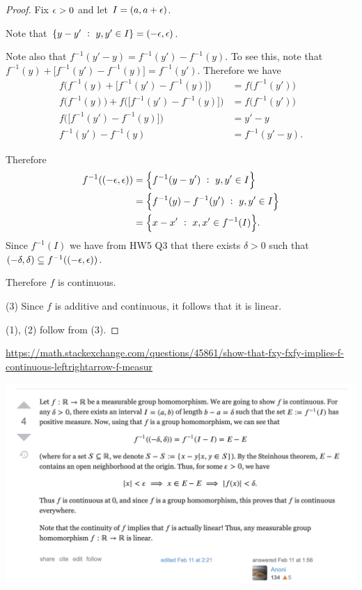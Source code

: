 \begin{proof}
  Fix $\epsilon > 0$ and let $I = (a, a + \epsilon)$.

  Note that $\{y - y' ~:~ y, y' \in I\} = (-\epsilon, \epsilon)$.

  Note also that $f^{-1}(y' - y) = f^{-1}(y') - f^{-1}(y)$. To see this, note
  that $f^{-1}(y) + \big[f^{-1}(y') - f^{-1}(y)\big] = f^{-1}(y')$. Therefore we have
  \begin{align*}
    f\Big(f^{-1}(y) + \big[f^{-1}(y') - f^{-1}(y)\big]\Big) &= f\big(f^{-1}(y')\big) \\
    f\Big(f^{-1}(y)\Big) + f\Big(\big[f^{-1}(y') - f^{-1}(y)\big]\Big) &= f\big(f^{-1}(y')\big) \\
    f\Big(\big[f^{-1}(y') - f^{-1}(y)\big]\Big) &= y' - y \\
    f^{-1}(y') - f^{-1}(y) &= f^{-1}(y' - y).
  \end{align*}

  Therefore
  \begin{align*}
    f^{-1}((-\epsilon, \epsilon))
    &= \Big\{f^{-1}(y - y') ~:~ y, y' \in I\Big\} \\
    &= \Big\{f^{-1}(y) - f^{-1}(y') ~:~ y, y' \in I\Big\} \\
    &= \Big\{x - x' ~:~ x, x' \in f^{-1}(I)\Big\}.
  \end{align*}
  Since $f^{-1}(I)$ we have from HW5 Q3 that there exists $\delta > 0$ such
  that $(-\delta, \delta) \subseteq f^{-1}((-\epsilon, \epsilon))$.

  Therefore $f$ is continuous.

  (3) Since $f$ is additive and continuous, it follows that it is linear.

  (1), (2) follow from (3).
\end{proof}


\url{https://math.stackexchange.com/questions/45861/show-that-fxy-fxfy-implies-f-continuous-leftrightarrow-f-measur}

\begin{mdframed}
\includegraphics[width=400pt]{img/analysis--berkeley-202a-hw06-e247.png}
\end{mdframed}

